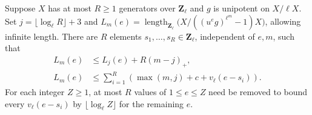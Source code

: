 \begin{proposition}\label{newcoh:centres}
Suppose \(X\) has at most \(R\ge1\) generators over \(\mathbf Z_\ell\)
and \(g\) is unipotent on \(X/\ell X\). Set
\(j=\lfloor\log_\ell R\rfloor+3\) and
\(L_m(e)=\operatorname{length}_{\mathbf Z_\ell}
\big(X/((u^eg)^{\ell^m}-1)X\big)\), allowing infinite length.
There are \(R\) elements \(s_1,\ldots,s_R\in\mathbf Z_\ell\),
independent of \(e,m\), such that
\begin{align}
 L_m(e)&\le L_j(e)+R(m-j)_+, \label{newcoh:growth}\\
 L_m(e)&\le\sum_{i=1}^R
 \left(\max(m,j)+c+v_\ell(e-s_i)\right). \label{newcoh:centreformula}
\end{align}
For each integer \(Z\ge1\), at most \(R\) values of \(1\le e\le Z\)
need be removed to bound every \(v_\ell(e-s_i)\) by
\(\lfloor\log_\ell Z\rfloor\) for the remaining \(e\).
\end{proposition}
